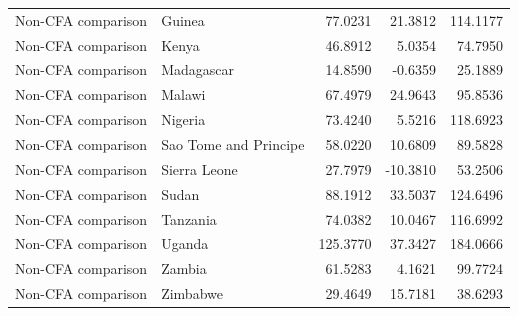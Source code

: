 \begin{table}
\begin{tabular}[t]{llrrr}
Non-CFA comparison & Guinea & 77.0231 & 21.3812 & 114.1177\\
Non-CFA comparison & Kenya & 46.8912 & 5.0354 & 74.7950\\
\addlinespace
Non-CFA comparison & Madagascar & 14.8590 & -0.6359 & 25.1889\\
Non-CFA comparison & Malawi & 67.4979 & 24.9643 & 95.8536\\
Non-CFA comparison & Nigeria & 73.4240 & 5.5216 & 118.6923\\
Non-CFA comparison & Sao Tome and Principe & 58.0220 & 10.6809 & 89.5828\\
Non-CFA comparison & Sierra Leone & 27.7979 & -10.3810 & 53.2506\\
\addlinespace
Non-CFA comparison & Sudan & 88.1912 & 33.5037 & 124.6496\\
Non-CFA comparison & Tanzania & 74.0382 & 10.0467 & 116.6992\\
Non-CFA comparison & Uganda & 125.3770 & 37.3427 & 184.0666\\
Non-CFA comparison & Zambia & 61.5283 & 4.1621 & 99.7724\\
Non-CFA comparison & Zimbabwe & 29.4649 & 15.7181 & 38.6293\\
\bottomrule
\end{tabular}
\end{table}